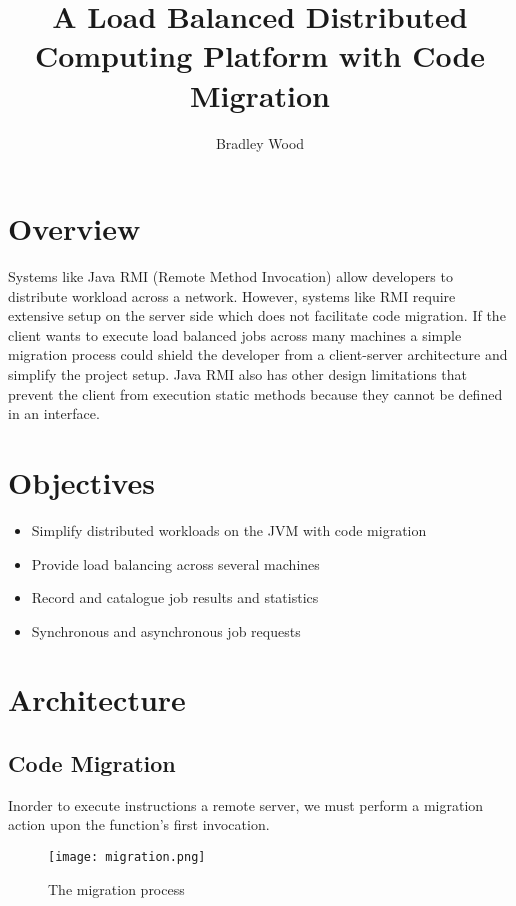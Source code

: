 \documentclass[10pt, oneside,english]{article}
\title{A Load Balanced Distributed Computing Platform with Code Migration}
\author[]{Bradley Wood}
\affil[ ]{University of Ontario Institute of Technology}
\date{}
\begin{document}
    \maketitle

    \section{Overview}\label{sec:overview}

    Systems like Java RMI (Remote Method Invocation) allow developers to distribute
    workload across a network.
    However, systems like RMI require extensive setup on the server side which does
    not facilitate code migration.
    If the client wants to execute load balanced jobs across many machines
    a simple migration process could shield the developer from a client-server
    architecture and simplify the project setup.
    Java RMI also has other design limitations that prevent the client from execution static
    methods because they cannot be defined in an interface.

    \section{Objectives}\label{sec:objectives}

    \begin{itemize}
        \item Simplify distributed workloads on the JVM with code migration
        \item Provide load balancing across several machines
        \item Record and catalogue job results and statistics
        \item Synchronous and asynchronous job requests
    \end{itemize}

    \section{Architecture}\label{sec:architecture}

    \subsection{Code Migration}\label{migration}

    Inorder to execute instructions a remote server, we must perform a migration action
    upon the function's first invocation.


    \begin{figure}
        \centering
        \texttt{[image: migration.png]}
        \caption{The migration process}
    \end{figure}
\end{document}
